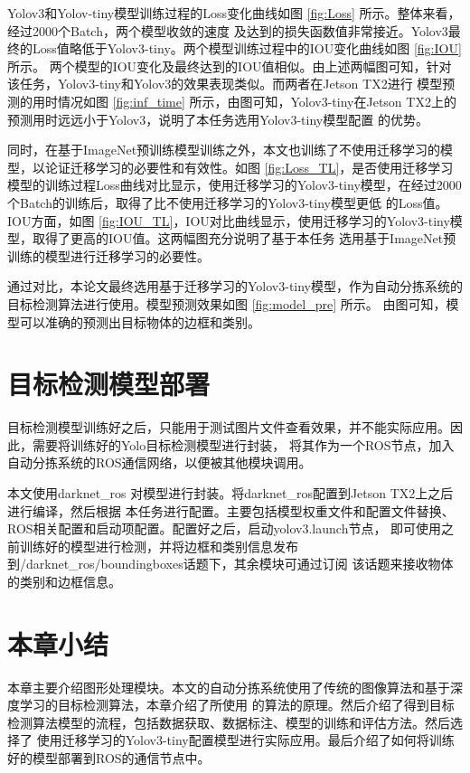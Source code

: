 Yolov3和Yolov-tiny模型训练过程的Loss变化曲线如图 \ref{fig:Loss} 所示。整体来看，经过2000个Batch，两个模型收敛的速度
及达到的损失函数值非常接近。Yolov3最终的Loss值略低于Yolov3-tiny。两个模型训练过程中的IOU变化曲线如图 \ref{fig:IOU} 所示。
两个模型的IOU变化及最终达到的IOU值相似。由上述两幅图可知，针对该任务，Yolov3-tiny和Yolov3的效果表现类似。而两者在Jetson TX2进行
模型预测的用时情况如图 \ref{fig:inf_time} 所示，由图可知，Yolov3-tiny在Jetson TX2上的预测用时远远小于Yolov3，说明了本任务选用Yolov3-tiny模型配置
的优势。

同时，在基于ImageNet预训练模型训练之外，本文也训练了不使用迁移学习的模型，以论证迁移学习的必要性和有效性。如图 \ref{fig:Loss_TL}，是否使用迁移学习
模型的训练过程Loss曲线对比显示，使用迁移学习的Yolov3-tiny模型，在经过2000个Batch的训练后，取得了比不使用迁移学习的Yolov3-tiny模型更低
的Loss值。IOU方面，如图 \ref{fig:IOU_TL}，IOU对比曲线显示，使用迁移学习的Yolov3-tiny模型，取得了更高的IOU值。这两幅图充分说明了基于本任务
选用基于ImageNet预训练的模型进行迁移学习的必要性。

通过对比，本论文最终选用基于迁移学习的Yolov3-tiny模型，作为自动分拣系统的目标检测算法进行使用。模型预测效果如图 \ref{fig:model_pre} 所示。
由图可知，模型可以准确的预测出目标物体的边框和类别。

\section{目标检测模型部署}

目标检测模型训练好之后，只能用于测试图片文件查看效果，并不能实际应用。因此，需要将训练好的Yolo目标检测模型进行封装，
将其作为一个ROS节点，加入自动分拣系统的ROS通信网络，以便被其他模块调用。

本文使用darknet\_ros \cite{darknet_ros}对模型进行封装。将darknet\_ros配置到Jetson TX2上之后进行编译，然后根据
本任务进行配置。主要包括模型权重文件和配置文件替换、ROS相关配置和启动项配置。配置好之后，启动yolov3.launch节点，
即可使用之前训练好的模型进行检测，并将边框和类别信息发布到/darknet\_ros/boundingboxes话题下，其余模块可通过订阅
该话题来接收物体的类别和边框信息。

\section{本章小结}
本章主要介绍图形处理模块。本文的自动分拣系统使用了传统的图像算法和基于深度学习的目标检测算法，本章介绍了所使用
的算法的原理。然后介绍了得到目标检测算法模型的流程，包括数据获取、数据标注、模型的训练和评估方法。然后选择了
使用迁移学习的Yolov3-tiny配置模型进行实际应用。最后介绍了如何将训练好的模型部署到ROS的通信节点中。